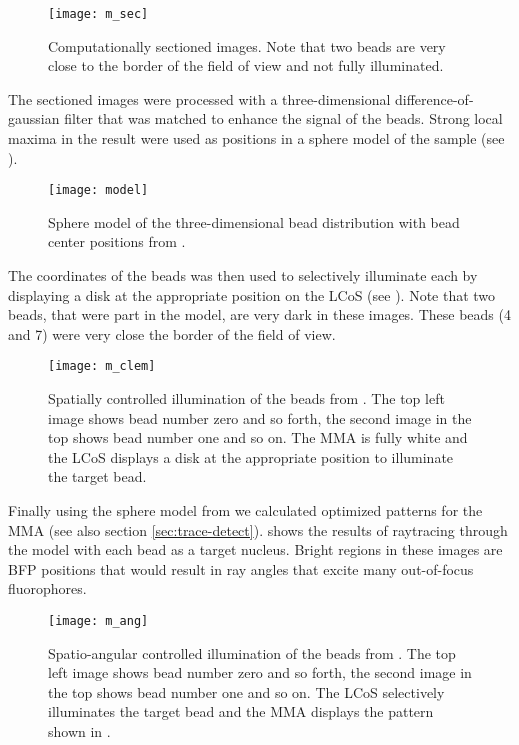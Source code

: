 \begin{figure}[H]
  \centering
  \texttt{[image: m\_sec]}
  \caption{Computationally sectioned images. Note that two beads are
    very close to the border of the field of view and not fully
    illuminated.}
  \label{fig:m_sec}
\end{figure}

The sectioned images were processed with a three-dimensional
difference-of-gaussian filter that was matched to enhance the signal
of the beads. Strong local maxima in the result were used as positions
in a sphere model of the sample (see ).

\begin{figure}[H]
  \centering
  \texttt{[image: model]}
  \caption{Sphere model of the three-dimensional bead distribution
    with bead center positions from .}
  \label{fig:model}
\end{figure}


The coordinates of the beads was then used to selectively illuminate
each by displaying a disk at the appropriate position on the LCoS (see
). Note that two beads, that were part in the
model, are very dark in these images. These beads (4 and 7) were very
close the border of the field of view.

\begin{figure}[H]
  \centering
  \texttt{[image: m\_clem]}
  \caption{Spatially controlled illumination of the beads from
    . The top left image shows bead number zero and
    so forth, the second image in the top shows bead number one and so
    on. The MMA is fully white and the LCoS displays a disk at the
    appropriate position to illuminate the target bead.}
  \label{fig:m_clem}
\end{figure}

Finally using the sphere model from  we calculated
optimized patterns for the MMA (see also section
\ref{sec:trace-detect}).  shows the results of
raytracing through the model with each bead as a target
nucleus. Bright regions in these images are BFP positions that would
result in ray angles that excite many out-of-focus fluorophores. 

\begin{figure}[H]
  \centering
  \texttt{[image: m\_ang]}
  \caption{Spatio-angular controlled illumination of the beads from
    . The top left image shows bead number zero and
    so forth, the second image in the top shows bead number one and so
    on. The LCoS selectively illuminates the target bead and the MMA
    displays the pattern shown in .}
  \label{fig:m_ang}
\end{figure}


